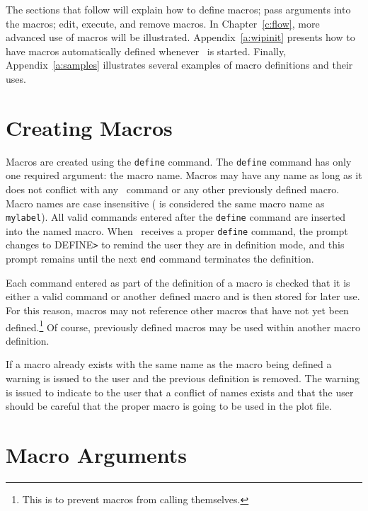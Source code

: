 The sections that follow will explain 
how to define macros; pass arguments into the macros; edit,
execute, and remove macros.
In Chapter~\ref{c:flow}, more advanced use of macros will be illustrated.
Appendix~\ref{a:wipinit} presents how to have macros automatically
defined whenever \wip\ is started.
Finally, Appendix~\ref{a:samples} illustrates several
examples of macro definitions and their uses.

\section		{Creating Macros}

Macros are created using the
{\tt define}%
command.
The {\tt define} command has only one required argument: the macro name.
Macros may have any name as long as it does not conflict with any \wip\
command or any other previously defined macro.
Macro names
are case insensitive ( is considered the same macro
name as {\tt mylabel}).
All valid commands entered after the {\tt define} command are
inserted into the named macro.
When \wip\ receives a proper {\tt define} command, the prompt changes to
{\rm DEFINE\verb+>+} to remind the user they are in definition mode,
and this prompt remains until the next
{\tt end}
command terminates the definition.

Each command entered as part of the definition of a macro
is checked that it is either a valid command or another defined macro
and is then stored for later use.
For this reason, macros may not reference other macros that have not yet
been defined.\footnote{This is to prevent macros from calling themselves.}
Of course, previously defined macros may be used within
another macro definition.

If a macro already exists with the same name as the macro being defined
a warning is issued to the user and the previous definition is removed.
The warning is issued to indicate to the user that a conflict of names
exists and that the user should be careful that the proper macro is
going to be used in the plot file.

\section		{Macro Arguments}

